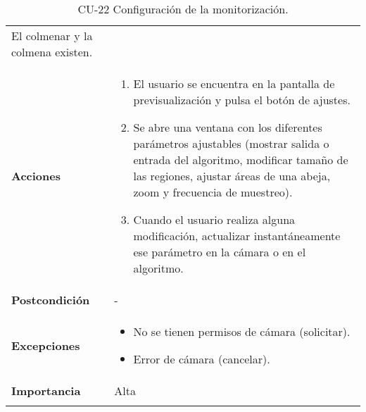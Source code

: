 \begin{longtable}[H]{@{}ll@{}}
\begin{minipage}[t]{0.68\columnwidth}
El colmenar y la colmena existen.\strut
\end{minipage}\tabularnewline
\begin{minipage}[t]{0.26\columnwidth}\raggedright\strut
\textbf{Acciones}\strut
\end{minipage} & \begin{minipage}[t]{0.68\columnwidth}\raggedright\strut
\begin{enumerate}
\def\labelenumi{\arabic{enumi}.}
\tightlist
\item
  El usuario se encuentra en la pantalla de previsualización y pulsa el
  botón de ajustes.
\item
  Se abre una ventana con los diferentes parámetros ajustables (mostrar
  salida o entrada del algoritmo, modificar tamaño de las regiones,
  ajustar áreas de una abeja, zoom y frecuencia de muestreo).
\item
  Cuando el usuario realiza alguna modificación, actualizar
  instantáneamente ese parámetro en la cámara o en el algoritmo.
\end{enumerate}\strut
\end{minipage}\tabularnewline
\begin{minipage}[t]{0.26\columnwidth}\raggedright\strut
\textbf{Postcondición}\strut
\end{minipage} & \begin{minipage}[t]{0.68\columnwidth}\raggedright\strut
-\strut
\end{minipage}\tabularnewline
\begin{minipage}[t]{0.26\columnwidth}\raggedright\strut
\textbf{Excepciones}\strut
\end{minipage} & \begin{minipage}[t]{0.68\columnwidth}\raggedright\strut
\begin{itemize}
\tightlist
\item
  No se tienen permisos de cámara (solicitar).
\item
  Error de cámara (cancelar).
\end{itemize}\strut
\end{minipage}\tabularnewline
\begin{minipage}[t]{0.26\columnwidth}\raggedright\strut
\textbf{Importancia}\strut
\end{minipage} & \begin{minipage}[t]{0.68\columnwidth}\raggedright\strut
Alta\strut
\end{minipage}\tabularnewline
\bottomrule
\caption{CU-22 Configuración de la monitorización.}
\end{longtable}

